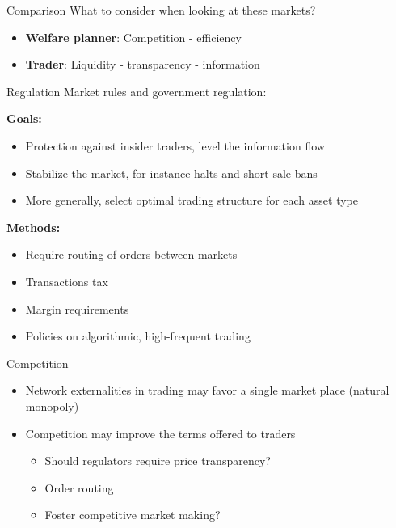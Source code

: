 \begin{frame}{Comparison}
	What to consider when looking at these markets?
	\begin{itemize}
		\item \textbf{Welfare planner}: Competition - efficiency 
		\item \textbf{Trader}: Liquidity - transparency - information
	\end{itemize}
\end{frame}


\begin{frame}{Regulation}
	Market rules and government regulation:
	
	\textbf{Goals:}
	\begin{itemize}
		\item Protection against insider traders, level the information flow
		\item Stabilize the market, for instance halts and short-sale bans
		\item More generally, select optimal trading structure for each asset type
	\end{itemize}
	\textbf{Methods:}
	\begin{itemize}
		\item Require routing of orders between markets
		\item Transactions tax
		\item Margin requirements
		\item Policies on algorithmic, high-frequent trading
	\end{itemize}
\end{frame}


\begin{frame}{Competition}
\begin{itemize}
	\item Network externalities in trading may favor a single market place (natural monopoly)
	\item Competition may improve the terms offered to traders
	\begin{itemize}
		\item Should regulators require price transparency?
		\item Order routing
		\item Foster competitive market making?
	\end{itemize}
\end{itemize}
\end{frame}


